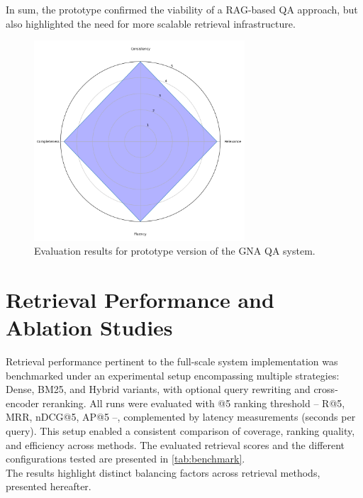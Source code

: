\begin{spacing}{1.5}
In sum, the prototype confirmed the viability of a RAG-based QA approach, but also highlighted the need for more scalable retrieval infrastructure.

\begin{figure}[H]
  \centering
  \includegraphics[width=0.7\textwidth]{images/radar.png} 
  \caption{Evaluation results for prototype version of the GNA QA system.}
  \label{fig:proto_results}
\end{figure}


\section{Retrieval Performance and Ablation Studies}\label{sec:retrieval_ablation}
Retrieval performance pertinent to the full-scale system implementation was benchmarked under an experimental setup encompassing multiple strategies: Dense, BM25, and Hybrid variants, with optional query rewriting and cross-encoder reranking. All runs were evaluated with @5 ranking threshold -- R@5, MRR, nDCG@5, AP@5 --, complemented by latency measurements (seconds per query). This setup enabled a consistent comparison of coverage, ranking quality, and efficiency across methods. The evaluated retrieval scores and the different configurations tested are presented in \autoref{tab:benchmark}.\\

\noindent The results highlight distinct balancing factors across retrieval methods, presented hereafter.\\


\end{spacing}
